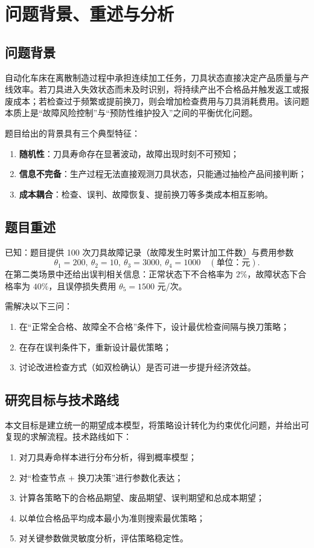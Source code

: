 \chapter{问题背景、重述与分析}

\section{问题背景}
自动化车床在离散制造过程中承担连续加工任务，刀具状态直接决定产品质量与产线效率。若刀具进入失效状态而未及时识别，将持续产出不合格品并触发返工或报废成本；若检查过于频繁或提前换刀，则会增加检查费用与刀具消耗费用。该问题本质上是“故障风险控制”与“预防性维护投入”之间的平衡优化问题。

题目给出的背景具有三个典型特征：
\begin{enumerate}
  \item \textbf{随机性}：刀具寿命存在显著波动，故障出现时刻不可预知；
  \item \textbf{信息不完备}：生产过程无法直接观测刀具状态，只能通过抽检产品间接判断；
  \item \textbf{成本耦合}：检查、误判、故障恢复、提前换刀等多类成本相互影响。
\end{enumerate}

\section{题目重述}
已知：题目提供 100 次刀具故障记录（故障发生时累计加工件数）与费用参数
\[
\theta_1=200,\ \theta_2=10,\ \theta_3=3000,\ \theta_4=1000\quad (\text{单位：元}).
\]
在第二类场景中还给出误判相关信息：正常状态下不合格率为 $2\%$，故障状态下合格率为 $40\%$，且误停损失费用 $\theta_5=1500$ 元/次。

需解决以下三问：
\begin{enumerate}
  \item 在“正常全合格、故障全不合格”条件下，设计最优检查间隔与换刀策略；
  \item 在存在误判条件下，重新设计最优策略；
  \item 讨论改进检查方式（如双检确认）是否可进一步提升经济效益。
\end{enumerate}

\section{研究目标与技术路线}
本文目标是建立统一的期望成本模型，将策略设计转化为约束优化问题，并给出可复现的求解流程。技术路线如下：
\begin{enumerate}
  \item 对刀具寿命样本进行分布分析，得到概率模型；
  \item 对“检查节点 + 换刀决策”进行参数化表达；
  \item 计算各策略下的合格品期望、废品期望、误判期望和总成本期望；
  \item 以单位合格品平均成本最小为准则搜索最优策略；
  \item 对关键参数做灵敏度分析，评估策略稳定性。
\end{enumerate}

